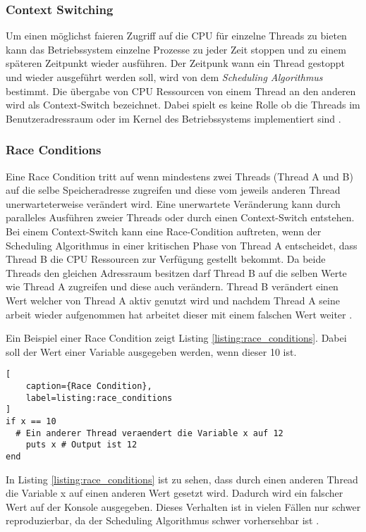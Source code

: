 \subsubsection{Context Switching}
Um einen möglichst faieren Zugriff auf die CPU für einzelne Threads zu bieten kann das Betriebssystem einzelne Prozesse zu jeder Zeit stoppen und zu einem späteren Zeitpunkt wieder ausführen. Der Zeitpunk wann ein Thread gestoppt und wieder ausgeführt werden soll, wird von dem \emph{Scheduling Algorithmus} bestimmt. Die übergabe von CPU Ressourcen von einem Thread an den anderen wird als Context-Switch bezeichnet. Dabei spielt es keine Rolle ob die Threads im Benutzeradressraum oder im Kernel des Betriebssystems implementiert sind \cite[p. 23]{Sto2013}.

\subsubsection{Race Conditions}

Eine Race Condition tritt auf wenn mindestens zwei Threads (Thread A und B) auf die selbe Speicheradresse zugreifen und diese vom jeweils anderen Thread unerwarteterweise verändert wird. Eine unerwartete Veränderung kann durch paralleles Ausführen zweier Threads oder durch einen Context-Switch entstehen. Bei einem Context-Switch kann eine Race-Condition auftreten, wenn der Scheduling Algorithmus in einer kritischen Phase von Thread A entscheidet, dass Thread B die CPU Ressourcen zur Verfügung gestellt bekommt. Da beide Threads den gleichen Adressraum besitzen darf Thread B auf die selben Werte wie Thread A zugreifen und diese auch verändern.  Thread B verändert einen Wert welcher von Thread A aktiv genutzt wird und nachdem Thread A seine arbeit wieder aufgenommen hat arbeitet dieser mit einem falschen Wert weiter \cite[p. 89]{tan09}. 

Ein Beispiel einer Race Condition zeigt Listing \ref{listing:race_conditions}. Dabei soll der Wert einer Variable ausgegeben werden, wenn dieser 10 ist.

\begin{lstlisting}[
	caption={Race Condition},
	label=listing:race_conditions
]
if x == 10
  # Ein anderer Thread veraendert die Variable x auf 12
	puts x # Output ist 12 
end
\end{lstlisting}

In Listing \ref{listing:race_conditions} ist zu sehen, dass durch einen anderen Thread die Variable x auf einen anderen Wert gesetzt wird. Dadurch wird ein falscher Wert auf der Konsole ausgegeben. Dieses Verhalten ist in vielen Fällen nur schwer reproduzierbar, da der Scheduling Algorithmus schwer vorhersehbar ist \cite[]{Net92}.

